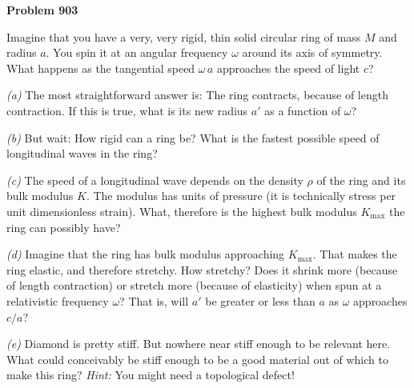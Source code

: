 \documentclass[12pt]{article}
\begin{document}
\begin{pottproblem}
\textbf{Problem 903}

Imagine that you have a very, very rigid, thin solid circular ring of mass $M$ and radius $a$.
You spin it at an angular frequency $\omega$ around its axis of symmetry.
What happens as the tangential speed $\omega\,a$ approaches the speed of light $c$?

\textsl{(a)} The most straightforward answer is: The ring contracts, because of length contraction.
If this is true, what is its new radius $a'$ as a function of $\omega$?

\textsl{(b)} But wait: How rigid can a ring be? What is the fastest possible speed of
longitudinal waves in the ring?

\textsl{(c)} The speed of a longitudinal wave depends on the density $\rho$ of the ring and its
bulk modulus $K$. The modulus has units of pressure (it is technically stress per unit dimensionless strain).
What, therefore is the highest bulk modulus $K_\mathrm{max}$ the ring can possibly have?

\textsl{(d)} Imagine that the ring has bulk modulus approaching $K_\mathrm{max}$.
That makes the ring elastic, and therefore stretchy.
How stretchy? Does it shrink more (because of length contraction) or stretch more (because of elasticity)
when spun at a relativistic frequency $\omega$?
That is, will $a'$ be greater or less than $a$ as $\omega$ approaches $c/a$?

\textsl{(e)} Diamond is pretty stiff. But nowhere near stiff enough to be relevant here.
What could conceivably be stiff enough to be a good material out of which to make this ring?
\textsl{Hint:} You might need a topological defect!

\end{pottproblem}
\end{document}
